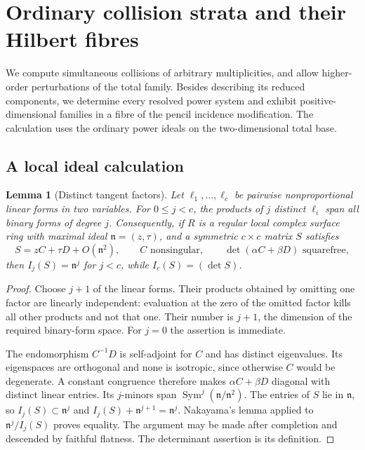 \documentclass[11pt,reqno]{amsart}
\numberwithin{equation}{section}
\newtheorem{lemma}[theorem]{Lemma}
\theoremstyle{definition}\newtheorem{definition}[theorem]{Definition}
\theoremstyle{remark}\newtheorem{remark}[theorem]{Remark}
\DeclareMathOperator{\Sym}{Sym}\DeclareMathOperator{\Gr}{Gr}
\begin{document}
\section{Ordinary collision strata and their Hilbert fibres}
\label{sec:ordinary-collisions-v159}
We compute simultaneous collisions of arbitrary multiplicities, and
allow higher-order perturbations of the total family. Besides describing
its reduced components, we determine every resolved power system and
exhibit positive-dimensional families in a fibre of the pencil
incidence modification. The calculation uses the ordinary power ideals
on the two-dimensional total base.

\subsection{A local ideal calculation}
\begin{lemma}[Distinct tangent factors]
\label{lem:tangent-factors-v159}
Let $\ell_1,\ldots,\ell_c$ be pairwise nonproportional linear forms
in two variables. For $0\leq j<c$, the products of $j$ distinct
$\ell_i$ span all binary forms of degree $j$. Consequently, if
$R$ is a regular local complex surface ring with maximal ideal
$\mathfrak n=(z,\tau)$, and a symmetric $c\times c$ matrix $S$ satisfies
\[
 S=zC+\tau D+O(\mathfrak n^2),
 \qquad C\text{ nonsingular},\qquad
 \det(\alpha C+\beta D)\text{ squarefree},
\]
then $I_j(S)=\mathfrak n^j$ for $j<c$, while
$I_c(S)=(\det S)$.
\end{lemma}
\begin{proof}
Choose $j+1$ of the linear forms. Their products obtained by omitting
one factor are linearly independent: evaluation at the zero of the
omitted factor kills all other products and not that one. Their
number is $j+1$, the dimension of the required binary-form space.
For $j=0$ the assertion is immediate.

The endomorphism $C^{-1}D$ is self-adjoint for $C$ and has distinct
eigenvalues. Its eigenspaces are orthogonal and none is isotropic,
since otherwise $C$ would be degenerate. A constant congruence
therefore makes $\alpha C+\beta D$ diagonal with distinct linear
entries. Its $j$-minors span $\Sym^j(\mathfrak n/\mathfrak n^2)$.
The entries of $S$ lie in $\mathfrak n$, so
$I_j(S)\subset\mathfrak n^j$ and
$I_j(S)+\mathfrak n^{j+1}=\mathfrak n^j$. Nakayama's lemma applied
to $\mathfrak n^j/I_j(S)$ proves equality. The argument may be made
after completion and descended by faithful flatness. The determinant
assertion is its definition.
\end{proof}
\end{document}
